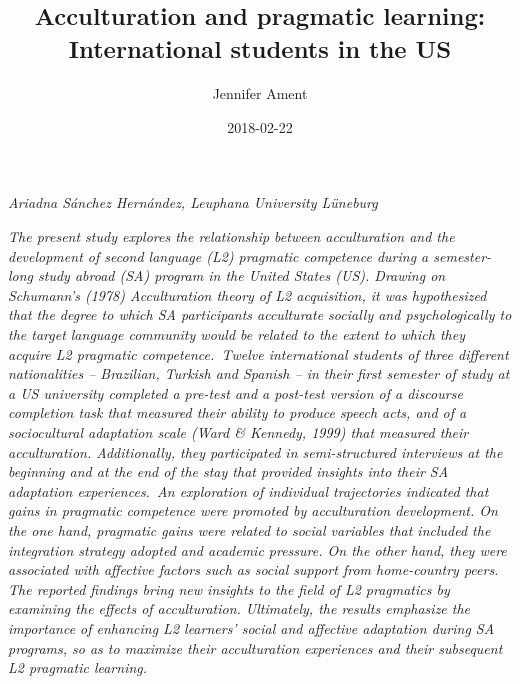 \documentclass[12pt]{article}
\title{}
\author{Jennifer Ament}
\date{2018-02-22}
\newenvironment{stylelsSourceline}{\renewcommand\baselinestretch{1.0}\setlength\leftskip{0.748in}\setlength\rightskip{0in plus 1fil}\setlength\parindent{0in}\setlength\parfillskip{0pt plus 1fil}\setlength\parskip{0in plus 1pt}\writerlistparindent\writerlistleftskip\leavevmode\normalfont\normalsize\itshape\writerlistlabel\ignorespaces}{\unskip\vspace{0in plus 1pt}\par}
\newenvironment{stylelsAbstract}{\setlength\leftskip{0.5in}\setlength\rightskip{0.5in}\setlength\parindent{0in}\setlength\parfillskip{0pt plus 1fil}\setlength\parskip{0in plus 1pt}\writerlistparindent\writerlistleftskip\leavevmode\normalfont\normalsize\itshape\writerlistlabel\ignorespaces}{\unskip\vspace{0.111in plus 0.0111in}\par}
\newcommand\writerlistleftskip{}
\newcommand\writerlistparindent{}
\newcommand\writerlistlabel{}
\begin{document}
\title{\textsuperscript{Acculturation and pragmatic learning: International students in the US}}
\maketitle

\begin{stylelsSourceline}
Ariadna Sánchez Hernández,\textsuperscript{ }Leuphana University Lüneburg
\end{stylelsSourceline}


\begin{stylelsAbstract}
The present study explores the relationship between acculturation and the development of second language (L2) pragmatic competence during a semester-long study abroad (SA) program in the United States (US). Drawing on Schumann’s (1978) Acculturation theory of L2 acquisition, it was hypothesized that the degree to which SA participants acculturate socially and psychologically to the target language community would be related to the extent to which they acquire L2 pragmatic competence.~Twelve international students of three different nationalities – Brazilian, Turkish and Spanish – in their first semester of study at a US university completed a pre-test and a post-test version of a discourse completion task that measured their ability to produce speech acts, and of a sociocultural adaptation scale (Ward \& Kennedy, 1999) that measured their acculturation. Additionally, they participated in semi-structured interviews at the beginning and at the end of the stay that provided insights into their SA adaptation experiences.~An exploration of individual trajectories indicated that gains in pragmatic competence were promoted by acculturation development. On the one hand, pragmatic gains were related to social variables that included the integration strategy adopted and academic pressure. On the other hand, they were associated with affective factors such as social support from home-country peers. The reported findings bring new insights to the field of L2 pragmatics by examining the effects of acculturation. Ultimately, the results emphasize the importance of enhancing L2 learners’ social and affective adaptation during SA programs, so as to maximize their acculturation experiences and their subsequent L2 pragmatic learning.
\end{stylelsAbstract}
\end{document}
